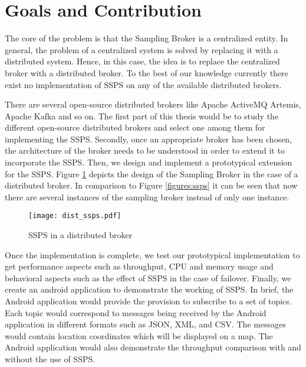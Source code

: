\section{Goals and Contribution}

The core of the problem is that the Sampling Broker is a centralized entity. In general, the problem of a centralized system is solved by replacing it with a distributed system. Hence, in this case, the idea is to replace the centralized broker with a distributed broker. To the best of our knowledge currently there exist no implementation of SSPS on any of the available distributed brokers. 

There are several open-source distributed brokers like Apache ActiveMQ Artemis, Apache Kafka and so on. The first part of this thesis would be to study the different open-source distributed brokers and select one among them for implementing the SSPS. Secondly, once an appropriate broker has been chosen, the architecture of the broker needs to be understood in order to extend it to incorporate the SSPS. Then, we design and implement a prototypical extension for the SSPS. Figure \ref{figures:dist_ssps} depicts the design of the Sampling Broker in the case of a distributed broker. In comparison to Figure \ref{figures:ssps} it can be seen that now there are several instances of the sampling broker instead of only one instance.

\makeatletter
\setlength{\@fptop}{0pt}
\makeatother

\begin{figure}[t!]
\centering
\texttt{[image: dist\_ssps.pdf]}
\caption{SSPS in a distributed broker}\label{figures:dist_ssps}
\end{figure}

Once the implementation is complete, we test our prototypical implementation to get performance aspects such as throughput, CPU and memory usage and behavioral aspects such as the effect of SSPS in the case of failover. Finally, we create an android application to demonstrate the working of SSPS. In brief, the Android application would provide the provision to subscribe to a set of topics. Each topic would correspond to messages being received by the Android application in different formats such as JSON, XML, and CSV. The messages would contain location coordinates which will be displayed on a map. The Android application would also demonstrate the throughput comparison with and without the use of SSPS.
